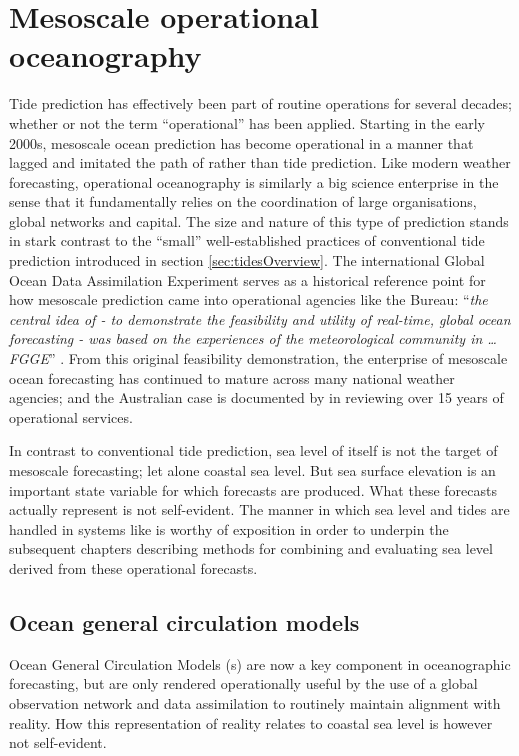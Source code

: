 \section{Mesoscale operational oceanography}
\label{sec:mesoscaleOperational}
Tide prediction has effectively been part of routine operations for several decades; whether or not the term ``operational'' has been applied.
Starting in the early 2000s, mesoscale ocean prediction has become operational in a manner that lagged and imitated the path of \NWP \citep{Harper:kb} rather than tide prediction. 
Like modern weather forecasting, operational oceanography is similarly a big science enterprise \citep{Petersen:2012tr} in the sense that it fundamentally relies on the coordination of large organisations, global networks and capital. 
The size and nature of this type of prediction stands in stark contrast to the ``small'' well-established practices of conventional tide prediction introduced in section \ref{sec:tidesOverview}.
The international Global Ocean Data Assimilation Experiment \GODAE{} serves as a historical reference point for how mesoscale prediction came into operational agencies like the Bureau:
``\textit{the central idea of \GODAE{} - to demonstrate the feasibility and utility of real-time, global ocean forecasting - was based on the experiences of the meteorological community in \dots{} FGGE}'' \citep{Bell:2009uv}.
From this original feasibility demonstration, the enterprise of mesoscale ocean forecasting has continued to mature across many national weather agencies; and the Australian case is documented by \citep{10.1080/1755876x.2019.1685834} in reviewing over 15 years of operational services.


In contrast to conventional tide prediction, sea level of itself is not the target of mesoscale forecasting; let alone coastal sea level.   But sea surface elevation is an important state variable for which forecasts are produced.  What these forecasts actually represent is not self-evident.  The manner in which sea level and tides are handled in systems like \BL{} is worthy of exposition in order to underpin the subsequent chapters describing methods for combining and evaluating sea level derived from these operational forecasts. 
  
\subsection{Ocean general circulation models}
Ocean General Circulation Models (\OGCM{}s) are now a key component in oceanographic forecasting, but are only rendered operationally useful by the use of a global observation network and data assimilation to routinely maintain alignment with reality.
How this representation of reality relates to coastal sea level is however not self-evident.



